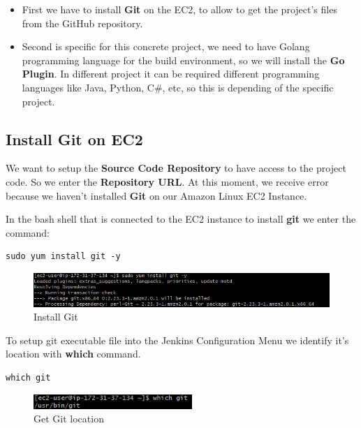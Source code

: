 \documentclass[12pt,a4paper,twoside]{article}
\begin{document}
\begin{itemize}
	\item First we have to install \textbf{Git} on the EC2, to allow to get the project's files from the GitHub repository.

	\item Second is specific for this concrete project, we need to have Golang programming language for the build environment, so we will install the \textbf{Go Plugin}. In different project it can be required different programming languages like Java, Python, C\#, etc, so this is depending of the specific project.
\end{itemize}


\subsection{Install Git on EC2}


We want to setup the \textbf{Source Code Repository} to have access to the project code. So we enter the \textbf{Repository URL}.
At this moment, we receive error because we haven't installed \textbf{Git} on our  Amazon Linux EC2 Instance.


In the bash shell that is connected to the EC2 instance to install \textbf{git} we enter the command:


\begin{verbatim}
sudo yum install git -y
\end{verbatim}


\begin{figure}[H]
    \centering
        \includegraphics[width=15cm]{images-aws/27-jenkins-install-git.png}
        \caption{Install Git}
\end{figure}


To setup git executable file into the Jenkins Configuration Menu we identify it's location with \textbf{which} command.


\begin{verbatim}
which git
\end{verbatim}


\begin{figure}[H]
    \centering
        \includegraphics[width=6cm]{images-aws/28-jenkins-git-on-local.png}
        \caption{Get Git location}
\end{figure}
\end{document}
